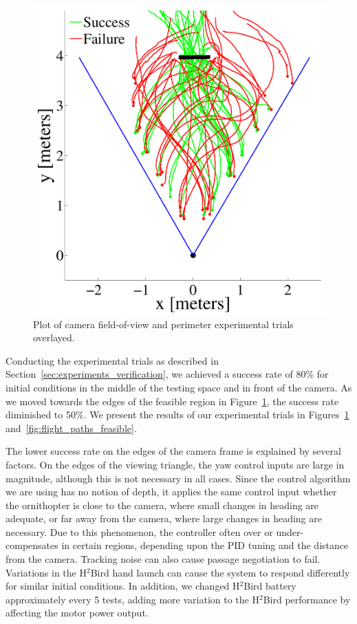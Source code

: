\documentclass{aamas2013}
\begin{document}
\begin{figure}[tb]
\begin{minipage}[b]{0.45\linewidth}
\centering
\includegraphics[width=\textwidth]{figures/flight_paths.pdf}
\caption{Plot of camera field-of-view and perimeter experimental trials overlayed.}
\label{fig:flight_paths}
\end{minipage}
\end{figure}

Conducting the experimental trials as described in 
Section~\ref{sec:experiments_verification}, we achieved a success rate of 
80\% for initial conditions in the middle of the testing space and in front 
of the camera. As we moved towards the edges of the feasible region in 
Figure~\ref{fig:flight_paths}, the success rate diminished to 50\%. We 
present the results of our experimental trials in Figures~\ref{fig:flight_paths} 
and~\ref{fig:flight_paths_feasible}.

The lower success rate on the edges of the camera frame is explained by 
several factors. On the edges of the viewing triangle, the yaw control 
inputs are large in magnitude, although this is not necessary in all cases. 
Since the control algorithm we are using has no notion of depth, it applies 
the same control input whether the ornithopter is close to the camera, where 
small changes in heading are adequate, or far away from the camera, where 
large changes in heading are necessary. Due to this phenomenon, the 
controller often over or under-compensates in certain regions, depending 
upon the PID tuning and the distance from the camera. Tracking noise can 
also cause passage negotiation to fail. Variations in the H$^2$Bird hand 
launch can cause the system to respond differently for similar initial 
conditions. In addition, we changed H$^2$Bird battery approximately every 5 
tests, adding more variation to the H$^2$Bird performance by affecting the 
motor power output.
\end{document}
